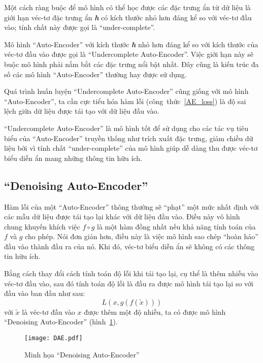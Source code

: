     Một cách ràng buộc để mô hình có thể học được các đặc trưng ẩn từ dữ liệu
    là giới hạn véc-tơ đặc trưng ẩn \textbf{\textit{h}} có kích thước nhỏ hơn đáng kể so với véc-tơ đầu vào;
    tính chất này được gọi là ``under-complete''.
    
    Mô hình ``Auto-Encoder'' với kích thước \textbf{\textit{h}} nhỏ hơn đáng kể so với kích thước của véc-tơ đầu vào
    được gọi là ``Undercomplete Auto-Encoder''. Việc giới hạn này sẽ buộc mô hình phải nắm bắt các đặc trưng
    nổi bật nhất. Đây cũng là kiến trúc đa số các mô hình ``Auto-Encoder'' thường hay được sử dụng.

    Quá trình huấn luyện ``Undercomplete Auto-Encoder'' cũng giống với mô hình ``Auto-Encoder'',
    ta cần cực tiểu hóa hàm lỗi (công~thức~\ref{AE_loss}) là độ sai lệch giữa dữ liệu được tái tạo
    với dữ liệu đầu vào.

    ``Undercomplete Auto-Encoder'' là mô hình tốt để sử dụng cho các tác vụ tiêu biểu của ``Auto-Encoder'' truyền thống
    như trích xuất đặc trưng, giảm chiều dữ liệu 
    bởi vì tính chất ``under-complete'' của mô hình giúp dễ dàng thu được véc-tơ biểu diễn ẩn mang những thông tin hữu ích.


    \subsection{``Denoising Auto-Encoder''}
    \label{chap2/subsec12}
    
    Hàm lỗi của một ``Auto-Encoder'' thông thường sẽ ``phạt'' một mức nhất định với các mẫu dữ liệu được tái tạo lại
    khác với dữ liệu đầu vào. Điều này vô hình chung khuyến khích việc 
    \begin{math}
        f \circ g
    \end{math}
    là một hàm đồng nhất nếu khả năng tính toán của 
    \begin{math}
        f
    \end{math} 
    và
    \begin{math}
        g
    \end{math}
    cho phép. Nói đơn giản hơn, điều này là việc mô hình sao chép ``hoàn hảo'' đầu vào thành đầu ra của nó.
    Khi đó, véc-tơ biểu diễn ẩn sẽ không có các thông tin hữu ích. 

    Bằng cách thay đổi cách tính toán độ lỗi khi tái tạo lại, cụ thể là thêm nhiễu vào véc-tơ đầu vào, 
    sau đó tính toán độ lỗi là đầu ra được mô hình tái tạo lại so với đầu vào ban đầu như sau:
    \begin{equation}
        L(x, g(f(\tilde{x})))
    \end{equation}
    với 
    \begin{math} \tilde{x} \end{math}
    là véc-tơ đầu vào 
    \begin{math}
        x
    \end{math} 
    được thêm một độ nhiễu, ta có được mô hình ``Denoising Auto-Encoder'' (hình~\ref{fig_DAE}). 
    \begin{figure}
        \centering
        \texttt{[image: DAE.pdf]}
        \caption{Minh họa ``Denoising Auto-Encoder''}
        \label{fig_DAE}
    \end{figure}
    
